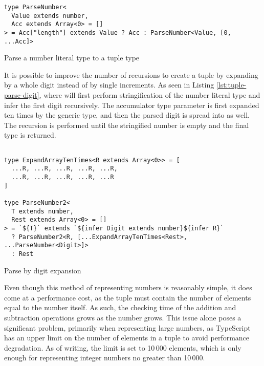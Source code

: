 \begin{listing}[ht]
  \begin{verbatim}
type ParseNumber<
  Value extends number,
  Acc extends Array<0> = []
> = Acc["length"] extends Value ? Acc : ParseNumber<Value, [0, ...Acc]>
\end{verbatim}
  \caption{Parse a number literal type to a tuple type}\label{lst:tuple-parse}
\end{listing}

It is possible to improve the number of recursions to create a tuple by expanding by a whole digit instead of by single increments. As seen in Listing \ref{lst:tuple-parse-digit}, where  will first perform stringification of the number literal type  and infer the first digit recursively. The accumulator type parameter  is first expanded ten times by the  generic type, and then the parsed digit is spread into  as well. The recursion is performed until the stringified number is empty and the final  type is returned.

\begin{listing}[ht]
  \begin{verbatim}

type ExpandArrayTenTimes<R extends Array<0>> = [
  ...R, ...R, ...R, ...R, ...R,
  ...R, ...R, ...R, ...R, ...R
]
    
type ParseNumber2<
  T extends number,
  Rest extends Array<0> = []
> = `${T}` extends `${infer Digit extends number}${infer R}`
  ? ParseNumber2<R, [...ExpandArrayTenTimes<Rest>, ...ParseNumber<Digit>]>
  : Rest
\end{verbatim}
  \caption{Parse by digit expansion}\label{lst:tuple-parse-digit}
\end{listing}

Even though this method of representing numbers is reasonably simple, it does come at a performance cost, as the tuple must contain the number of elements equal to the number itself. As such, the checking time of the addition and subtraction operations grows as the number grows. This issue alone poses a significant problem, primarily when representing large numbers, as TypeScript has an upper limit on the number of elements in a tuple to avoid performance degradation. As of writing, the limit is set to 10\,000 elements\cite{ImplementationCheckerTs2023}, which is only enough for representing integer numbers no greater than 10\,000.

